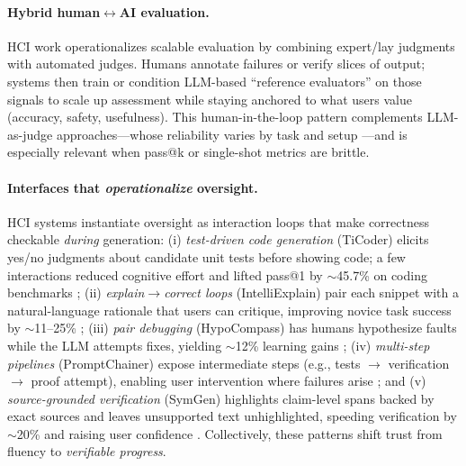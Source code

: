 \documentclass[numbers]{article}
\begin{document}
\paragraph{Hybrid human$\leftrightarrow$AI evaluation.}
HCI work operationalizes scalable evaluation by combining expert/lay judgments with automated judges. Humans annotate failures or verify slices of output; systems then train or condition LLM-based ``reference evaluators'' on those signals to scale up assessment while staying anchored to what users value (accuracy, safety, usefulness). This human-in-the-loop pattern complements LLM-as-judge approaches---whose reliability varies by task and setup \citep{Kocmi2024HumanVsLLM,Li2024TrustLLMJudgments}---and is especially relevant when pass@k or single-shot metrics are brittle.%

\paragraph{Interfaces that \emph{operationalize} oversight.}
HCI systems instantiate oversight as interaction loops that make correctness checkable \emph{during} generation: (i) \emph{test-driven code generation} (TiCoder) elicits yes/no judgments about candidate unit tests before showing code; a few interactions reduced cognitive effort and lifted pass@1 by $\sim$45.7\% on coding benchmarks \citep{naik2024ticoder}; (ii) \emph{explain$\rightarrow$correct loops} (IntelliExplain) pair each snippet with a natural-language rationale that users can critique, improving novice task success by $\sim$11--25\% \citep{yan2024intelliexplain}; (iii) \emph{pair debugging} (HypoCompass) has humans hypothesize faults while the LLM attempts fixes, yielding $\sim$12\% learning gains \citep{ma2024hypocompass}; (iv) \emph{multi-step pipelines} (PromptChainer) expose intermediate steps (e.g., tests $\rightarrow$ verification $\rightarrow$ proof attempt), enabling user intervention where failures arise \citep{wu2022promptchainer}; and (v) \emph{source-grounded verification} (SymGen) highlights claim-level spans backed by exact sources and leaves unsupported text unhighlighted, speeding verification by $\sim$20\% and raising user confidence \citep{shen2024symgen}. Collectively, these patterns shift trust from fluency to \emph{verifiable progress}.%
\end{document}
